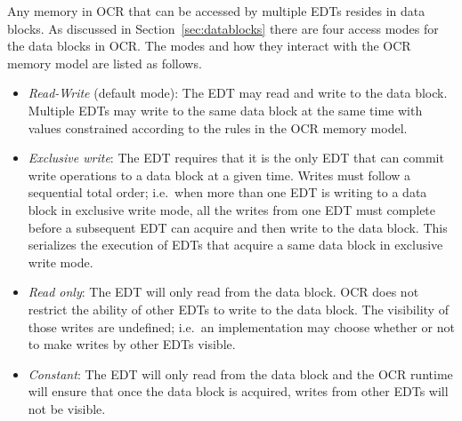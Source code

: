 Any memory in OCR that can be accessed by multiple EDTs resides in data blocks.  As
discussed in Section~\ref{sec:datablocks} there
are four access modes for the data blocks in OCR. The modes and how they
interact with the OCR memory model are listed as follows.
\begin{itemize}

\item \emph{Read-Write} (default mode):
  The EDT may read and write to the data block. Multiple EDTs may
  write to the same data block at the same time with values
  constrained according to the rules in the OCR memory model.

\item \emph{Exclusive write}: The
  EDT requires that it is the only EDT that can commit write
  operations to a data block at a given time. Writes must follow a
  sequential total order; i.e.\ when more than one EDT is writing
  to a data block in exclusive write mode, all the writes from one EDT
  must complete before a subsequent EDT can acquire and then write to
  the data block. This serializes the execution of
  EDTs that acquire a same data block in exclusive write mode.

\item \emph{Read only}: The EDT
  will only read from the data block. OCR does
  not restrict the ability of other EDTs to write to the data block. The
  visibility of those writes are undefined; i.e.\ an implementation may
  choose whether or not to make writes by other EDTs visible.

\item \emph{Constant}: The EDT will
  only read from the data block and the OCR runtime will ensure
  that once the data block is acquired, writes from other EDTs
  will not be visible.

\end{itemize}


